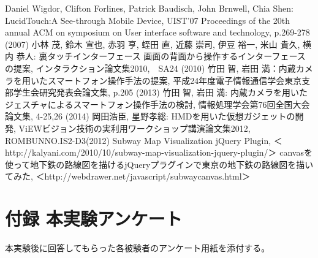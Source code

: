 \documentclass[11pt,a4j, titlepage]{jarticle} %
\begin{document}
\newpage
\begin{thebibliography}{数字}
   Daniel Wigdor, Clifton Forlines, Patrick Baudisch, John Brnwell, Chia Shen: LucidTouch:A See-through Mobile Device, UIST’07 Proceedings of the 20th annual ACM on symposium on User interface software and technology, p.269-278 (2007)
   小林 茂, 鈴木 宣也, 赤羽 亨, 蛭田 直, 近藤 崇司, 伊豆 裕一, 米山 貴久, 横内 恭人: 裏タッチインターフェース 画面の背面から操作するインターフェースの提案, インタラクション論文集2010,　SA24 (2010)
   竹田 智, 岩田 満：内蔵カメラを用いたスマートフォン操作手法の提案, 平成24年度電子情報通信学会東京支部学生会研究発表会論文集, p.205 (2013)
   竹田 智, 岩田 満: 内蔵カメラを用いたジェスチャによるスマートフォン操作手法の検討, 情報処理学会第76回全国大会論文集, 4-25,26 (2014)
   岡田浩臣, 星野孝総: HMDを用いた仮想ガジェットの開発, ViEWビジョン技術の実利用ワークショップ講演論文集2012, ROMBUNNO.IS2-D3(2012)
   Subway Map Visualization jQuery Plugin, ＜http://kalyani.com/2010/10/subway-map-visualization-jquery-plugin/＞
   canvasを使って地下鉄の路線図を描けるjQueryプラグインで東京の地下鉄の路線図を描いてみた, ＜http://webdrawer.net/javascript/subwaycanvas.html＞
\end{thebibliography}

\newpage
\section*{付録 本実験アンケート}
本実験後に回答してもらった各被験者のアンケート用紙を添付する。
\end{document}

